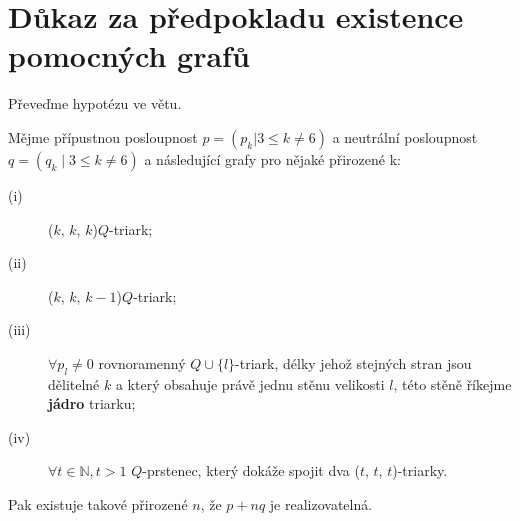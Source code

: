 

\section{Důkaz za předpokladu existence pomocných grafů}
Převeďme hypotézu ve větu.

\begin{veta}\label{veta02:2}
Mějme přípustnou posloupnost $p=(p_k | 3 \leq k \neq 6)$ a neutrální posloupnost $q=(q_k \mid 3 \leq k \neq 6)$ a následující grafy pro nějaké přirozené k:
\begin{description}
\item[(i)] ($k$, $k$, $k$)$Q$-triark;
\item[(ii)] ($k$, $k$, $k-1$)$Q$-triark;
\item[(iii)] $\forall p_l \neq 0$ rovnoramenný $Q\cup \lbrace l \rbrace$-triark, délky jehož stejných stran jsou dělitelné $k$ a který obsahuje právě jednu stěnu velikosti $l$, této stěně říkejme \textbf{jádro} triarku;
\item[(iv)] $\forall t \in \mathbb{N}, t>1$ $Q$-prstenec, který dokáže spojit dva ($t$, $t$, $t$)-triarky.
\end{description} 

Pak existuje takové přirozené $n$, že $p+nq$ je realizovatelná.
\end{veta}


